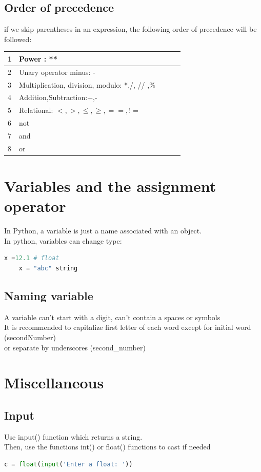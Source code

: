 \documentclass[12pt,oneside]{book}
\begin{document}
\subsection{Order of precedence}
if we skip parentheses in an expression, the following order of precedence will be followed:\\
\begin{tabular}{|l|l|l|l|l|}
	\hline
	1 & Power : **                                    \\ \hline
	2 & Unary operator minus: -                       \\ \hline
	3 & Multiplication, division, modulo: *,/, // ,\% \\ \hline
	4 & Addition,Subtraction:+,-                      \\ \hline
	5 & Relational: $<,>,\leq,\geq,==,!=$             \\ \hline
	6 & not                                           \\ \hline
	7 & and                                           \\ \hline
	8 & or                                            \\ \hline
\end{tabular}
\section{Variables and the assignment operator}
In Python, a variable is just a name associated with an object. \\
In python, variables can change type:
\begin{lstlisting}[language=python]
    x =12.1 # float 
    x = "abc" string
\end{lstlisting}
\subsection{Naming variable}
A variable can't start with a digit, can't contain a spaces or symbols \\
It is recommended to capitalize first letter of each word except for initial word (secondNumber)\\
or separate by underscores (second\_number)
\section{Miscellaneous}
\subsection{Input}
Use input() function which returns a string.\\
Then, use the functions int() or float() functions to cast if needed
\begin{lstlisting}[language=python]
c = float(input('Enter a float: '))
\end{lstlisting}
\end{document}
